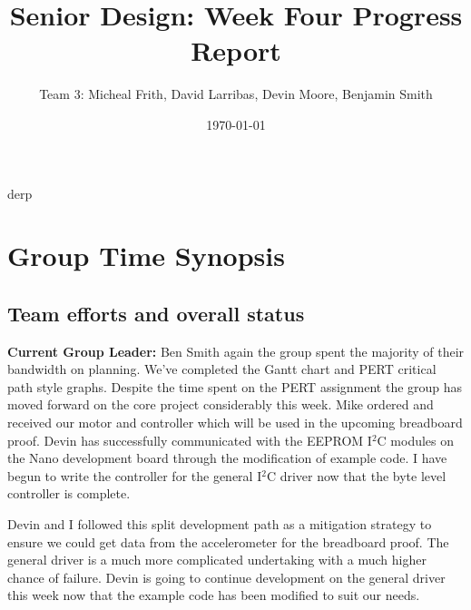 \documentclass[12pt,compsoc]{IEEEtran}
\begin{document}
\title{Senior Design: Week Four Progress Report}
\author{Team 3: Micheal Frith, David Larribas, Devin Moore, Benjamin Smith}
\date{\today}
\maketitle

{derp}

\section{Group Time Synopsis}
	\subsection{Team efforts and overall status}
		{\bfseries Current Group Leader:} Ben Smith
		 again the group spent the majority of their bandwidth on planning. We've 
		completed the Gantt chart and PERT critical path style graphs. Despite the time spent on the 
		PERT assignment the group has moved forward on the core project considerably this week.  Mike 
		ordered and received our motor and controller which will be used in the upcoming breadboard proof. 
		Devin has successfully communicated with the EEPROM I$^2$C modules on the Nano development board 
		through the modification of example code. I have begun to write the controller for the general 
		I$^2$C driver now that the byte level controller is complete. 

			Devin and I followed this split development path as a mitigation strategy to ensure we 
		could get data from the accelerometer for the breadboard proof. The general driver is a much 
		more complicated undertaking with a much higher chance of failure. Devin is going to continue 
		development on the general driver this week now that the example code has been modified to suit
		our needs.
\end{document}
